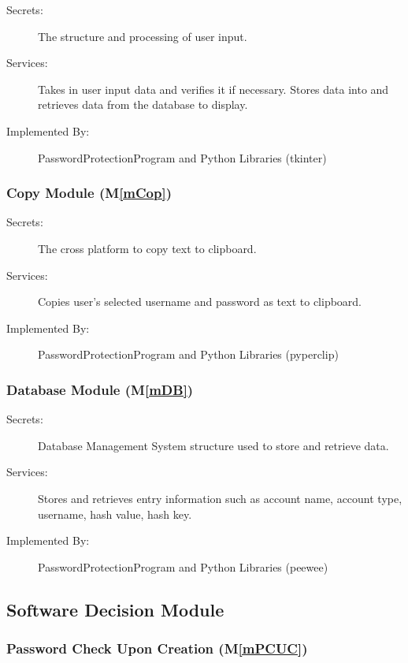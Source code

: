 \documentclass[12pt, titlepage]{article}
\newcommand{\mref}[1]{M\ref{#1}}
\begin{document}
\begin{description}
\item[Secrets:] The structure and processing of user input.
\item[Services:] Takes in user input data and verifies it if necessary. Stores data into and retrieves data from the database to display.
\item[Implemented By:] PasswordProtectionProgram and Python Libraries (tkinter)
\end{description}

\subsubsection{Copy Module (\mref{mCop})}

\begin{description}
\item[Secrets:] The cross platform to copy text to clipboard.
\item[Services:] Copies user's selected username and password as text to clipboard.
\item[Implemented By:] PasswordProtectionProgram and Python Libraries (pyperclip)
\end{description}

\subsubsection{Database Module (\mref{mDB})}

\begin{description}
\item[Secrets:] Database Management System structure used to store and retrieve data.
\item[Services:] Stores and retrieves entry information such as account name, account type, username, hash value, hash key.
\item[Implemented By:] PasswordProtectionProgram and Python Libraries (peewee)
\end{description}


\subsection{Software Decision Module}

\subsubsection{Password Check Upon Creation (\mref{mPCUC})}
\end{document}
